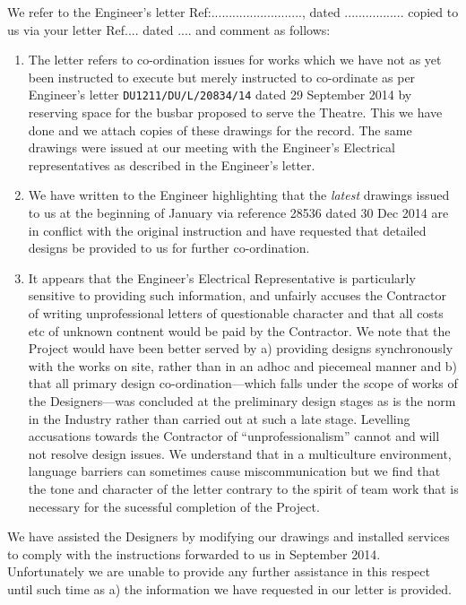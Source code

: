 \documentclass[twoside]{book}
\begin{document}
We refer to the Engineer’s letter Ref:.........................., dated .................  copied to us via your letter Ref.... dated ....
and comment as follows:

\begin{enumerate}
\item The letter refers to co-ordination issues for works which we have not as yet been instructed to
execute but merely instructed to co-ordinate as per Engineer’s letter \texttt{DU1211/DU/L/20834/14} dated 29 September 2014 by reserving space for the busbar proposed to serve the Theatre. This we have done and we attach copies of these drawings for the record. The same drawings were issued at our meeting with the Engineer’s Electrical representatives as described in the Engineer’s letter.

\item We have written to the Engineer highlighting that the \textit{latest} drawings issued to us at the beginning of January via reference 28536 dated 30 Dec 2014  are in conflict with the original instruction and have requested that detailed designs be provided to us for further co-ordination.

\item It appears that the Engineer’s Electrical Representative is particularly sensitive to providing such information, and unfairly accuses the Contractor of writing unprofessional letters of questionable character and that all costs etc of unknown contnent would be paid by the Contractor. We note that the Project would have been better served by a) providing designs synchronously with the works on site, rather than in an adhoc and piecemeal manner and b) that all primary design co-ordination---which falls under the scope of works of the Designers---was concluded at the preliminary design stages as is the norm in the Industry rather than carried out at such a late stage.
Levelling accusations towards the Contractor of “unprofessionalism” cannot and will not resolve design issues. We understand that in a multiculture environment, language barriers can sometimes cause miscommunication but we find that the tone and character of the letter contrary to the spirit of team work that is necessary for the sucessful completion of the Project.
\end{enumerate}

We have assisted the Designers by modifying our drawings and installed services to comply with the instructions forwarded to us in September 2014. Unfortunately we are unable to provide any further assistance in this respect until such time as a) the information we have requested in our letter is provided.
\end{document}

